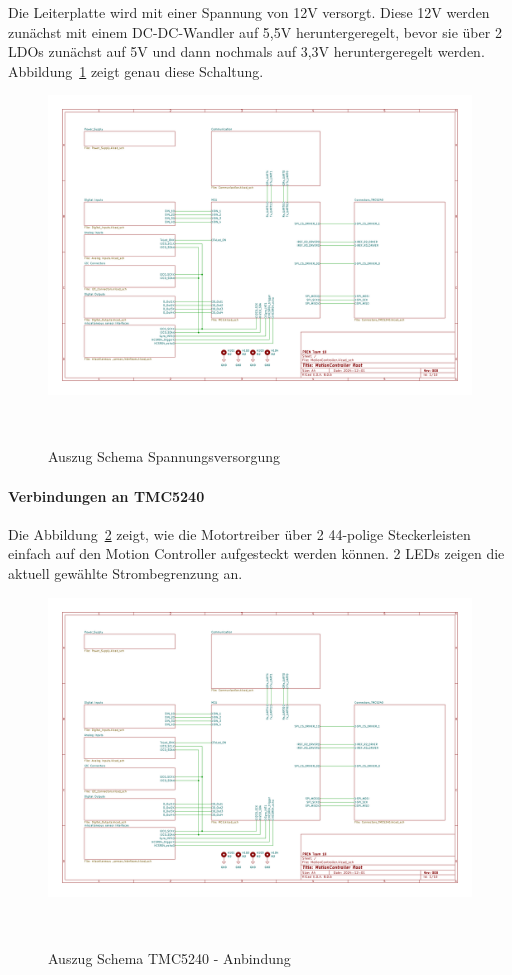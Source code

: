 \documentclass[main.  tex]{subfiles} %
\begin{document}
Die Leiterplatte wird mit einer Spannung von 12V versorgt. Diese 12V werden
zunächst mit einem DC-DC-Wandler auf 5,5V heruntergeregelt, bevor sie über 2
LDOs zunächst auf 5V und dann nochmals auf 3,3V heruntergeregelt werden.
Abbildung~\ref{fig:Schema_Spannungsversorgung} zeigt genau diese Schaltung.

\begin{figure}[H]
    \centering
    \includegraphics[page=2,width=\textwidth]{../Anhang_pdfs/MotionController.pdf}
    \caption{Auszug Schema Spannungsversorgung}~\label{fig:Schema_Spannungsversorgung}
\end{figure}

\newpage

\paragraph{Verbindungen an TMC5240}
Die Abbildung~\ref{fig:Schema_TMC5240} zeigt, wie die Motortreiber über 2
44-polige Steckerleisten einfach auf den Motion Controller aufgesteckt werden
können. 2 LEDs zeigen die aktuell gewählte Strombegrenzung an.

\begin{figure}[H]
    \centering
    \includegraphics[page=3,width=\textwidth]{../Anhang_pdfs/MotionController.pdf}
    \caption{Auszug Schema TMC5240 - Anbindung}~\label{fig:Schema_TMC5240}
\end{figure}
\end{document}
